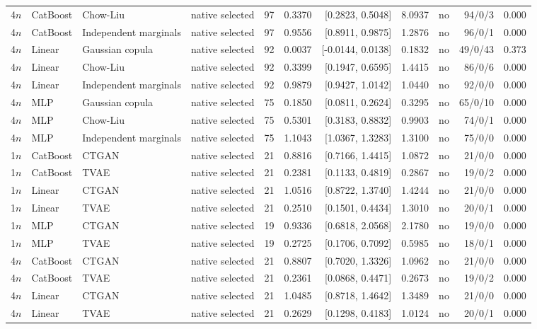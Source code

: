 \begin{longtable}{lllllrrllrl}
4$n$ & CatBoost & Chow-Liu & native selected & 97 & 0.3370 & [0.2823, 0.5048] & 8.0937 & no & 94/0/3 & 0.000 \\
4$n$ & CatBoost & Independent marginals & native selected & 97 & 0.9556 & [0.8911, 0.9875] & 1.2876 & no & 96/0/1 & 0.000 \\
4$n$ & Linear & Gaussian copula & native selected & 92 & 0.0037 & [-0.0144, 0.0138] & 0.1832 & no & 49/0/43 & 0.373 \\
4$n$ & Linear & Chow-Liu & native selected & 92 & 0.3399 & [0.1947, 0.6595] & 1.4415 & no & 86/0/6 & 0.000 \\
4$n$ & Linear & Independent marginals & native selected & 92 & 0.9879 & [0.9427, 1.0142] & 1.0440 & no & 92/0/0 & 0.000 \\
4$n$ & MLP & Gaussian copula & native selected & 75 & 0.1850 & [0.0811, 0.2624] & 0.3295 & no & 65/0/10 & 0.000 \\
4$n$ & MLP & Chow-Liu & native selected & 75 & 0.5301 & [0.3183, 0.8832] & 0.9903 & no & 74/0/1 & 0.000 \\
4$n$ & MLP & Independent marginals & native selected & 75 & 1.1043 & [1.0367, 1.3283] & 1.3100 & no & 75/0/0 & 0.000 \\
1$n$ & CatBoost & CTGAN & native selected & 21 & 0.8816 & [0.7166, 1.4415] & 1.0872 & no & 21/0/0 & 0.000 \\
1$n$ & CatBoost & TVAE & native selected & 21 & 0.2381 & [0.1133, 0.4819] & 0.2867 & no & 19/0/2 & 0.000 \\
1$n$ & Linear & CTGAN & native selected & 21 & 1.0516 & [0.8722, 1.3740] & 1.4244 & no & 21/0/0 & 0.000 \\
1$n$ & Linear & TVAE & native selected & 21 & 0.2510 & [0.1501, 0.4434] & 1.3010 & no & 20/0/1 & 0.000 \\
1$n$ & MLP & CTGAN & native selected & 19 & 0.9336 & [0.6818, 2.0568] & 2.1780 & no & 19/0/0 & 0.000 \\
1$n$ & MLP & TVAE & native selected & 19 & 0.2725 & [0.1706, 0.7092] & 0.5985 & no & 18/0/1 & 0.000 \\
4$n$ & CatBoost & CTGAN & native selected & 21 & 0.8807 & [0.7020, 1.3326] & 1.0962 & no & 21/0/0 & 0.000 \\
4$n$ & CatBoost & TVAE & native selected & 21 & 0.2361 & [0.0868, 0.4471] & 0.2673 & no & 19/0/2 & 0.000 \\
4$n$ & Linear & CTGAN & native selected & 21 & 1.0485 & [0.8718, 1.4642] & 1.3489 & no & 21/0/0 & 0.000 \\
4$n$ & Linear & TVAE & native selected & 21 & 0.2629 & [0.1298, 0.4183] & 1.0124 & no & 20/0/1 & 0.000 \\

\end{longtable}
